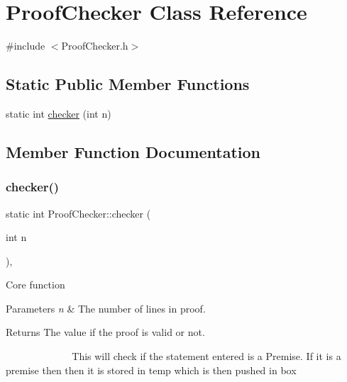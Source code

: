 \hypertarget{class_proof_checker}{}\section{Proof\+Checker Class Reference}
\label{class_proof_checker}


{\ttfamily \#include $<$Proof\+Checker.\+h$>$}

\subsection*{Static Public Member Functions}
\begin{DoxyCompactItemize}
\item 
static int \mbox{\hyperlink{class_proof_checker_a056d59c987ebf513911bd7ae88b1a75a}{checker}} (int n)
\end{DoxyCompactItemize}


\subsection{Member Function Documentation}
\mbox{\label{class_proof_checker_a056d59c987ebf513911bd7ae88b1a75a}} 
\subsubsection{\texorpdfstring{checker()}{checker()}}
{\footnotesize\ttfamily static int Proof\+Checker\+::checker (\begin{DoxyParamCaption}\item[{int}]{n }\end{DoxyParamCaption})\hspace{0.3cm}{\ttfamily [inline]}, {\ttfamily [static]}}

Core function 
\begin{DoxyParams}{Parameters}
{\em n} & The number of lines in proof. \\
\hline
\end{DoxyParams}
\begin{DoxyReturn}{Returns}
The value if the proof is valid or not. 
\end{DoxyReturn}
~\newline
~\newline
~\newline
~\newline
~\newline
~\newline
~\newline
~\newline
This will check if the statement entered is a Premise. If it is a premise then then it is stored in temp which is then pushed in box

